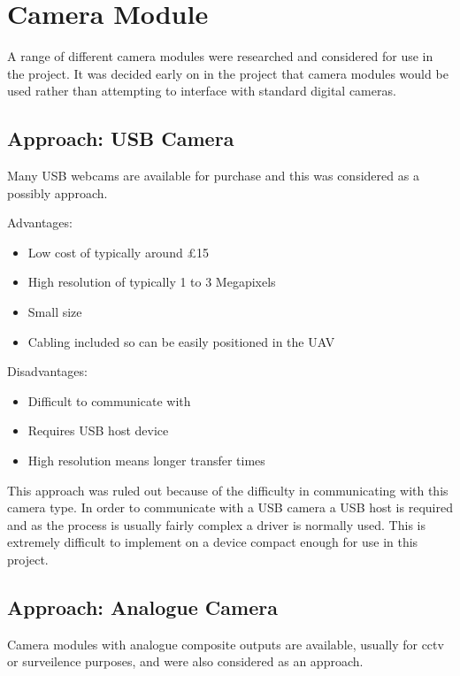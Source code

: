 \section{Camera Module}
\label{sec:John_options}

A range of different camera modules were researched and considered for use in the project. It was decided early on in the project that camera modules would be used rather than attempting to interface with standard digital cameras.

\subsection{Approach: USB Camera}
\label{sec:USB_option}
Many USB webcams are available for purchase and this was considered as a possibly approach.

Advantages:
      \begin{itemize}
         \item Low cost of typically around \pounds 15
         \item High resolution of typically 1 to 3 Megapixels
		 \item Small size
		 \item Cabling included so can be easily positioned in the UAV
     \end{itemize}

Disadvantages:
     \begin{itemize}
        \item Difficult to communicate with
        \item Requires USB host device
		\item High resolution means longer transfer times
     \end{itemize}

This approach was ruled out because of the difficulty in communicating with this camera type. In order to communicate with a USB camera a USB host is required and as the process is usually fairly complex a driver is normally used. This is extremely difficult to implement on a device compact enough for use in this project.

\subsection{Approach: Analogue Camera}
\label{sec:Analog_option}
Camera modules with analogue composite outputs are available, usually for cctv or surveilence purposes, and were also considered as an approach.

